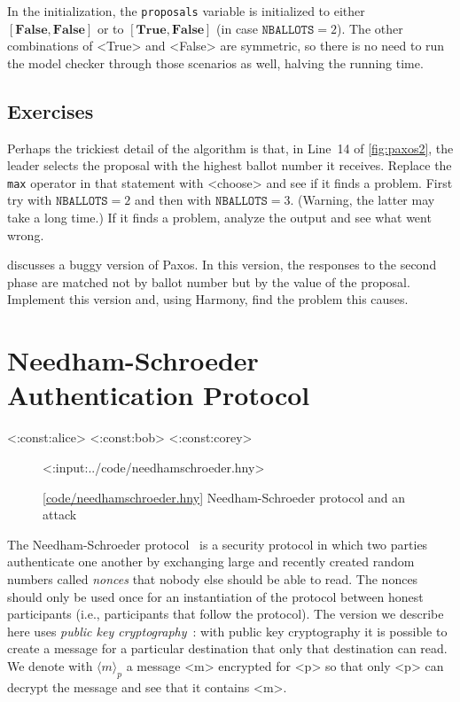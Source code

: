 \documentclass{report}
\newcommand{\harmonylink}[1]{%
[\href{https://harmony.cs.cornell.edu/#1}{\underline{#1}}]%
}
\newenvironment{code}{
\tcolorbox
}{
\endtcolorbox
}
\begin{document}
In the initialization, the \texttt{proposals} variable is initialized
to either $[\mathbf{False}, \mathbf{False}]$ or
to $[\mathbf{True}, \mathbf{False}]$ (in case $\texttt{NBALLOTS} = 2$).
The other combinations of <{True}> and <{False}> are symmetric,
so there is no need to run the model checker through those scenarios as
well, halving the running time.

\section*{Exercises}
\begin{problems}
\item Perhaps the trickiest detail of the algorithm is that, in Line~14
of \autoref{fig:paxos2}, the leader selects the proposal with the highest
ballot number it receives.  Replace the \texttt{max} operator in that statement
with <{choose}> and see if it finds a problem.  First try with
$\texttt{NBALLOTS} = 2$ and then with $\texttt{NBALLOTS} = 3$.
(Warning, the latter may take a long time.)  If it finds a problem,
analyze the output and see what went wrong.
\item \cite{MWA19} discusses a buggy version of Paxos.  In this version,
the responses to the second phase are matched not by ballot number but
by the value of the proposal.  Implement this version and, using Harmony,
find the problem this causes.
\end{problems}

\chapter{Needham-Schroeder Authentication Protocol}
\label{ch:ns}

<{:const:alice}>
<{:const:bob}>
<{:const:corey}>

\begin{figure}
\begin{code}
<{:input:../code/needhamschroeder.hny}>
\end{code}
\caption{\harmonylink{code/needhamschroeder.hny} Needham-Schroeder protocol and an attack}
\label{fig:ns}
\end{figure}

The Needham-Schroeder protocol~\cite{NS78} is a security protocol in which two parties
authenticate one another by exchanging large and recently created random numbers
called \emph{nonces} that nobody else should be able to read.
The nonces should only be used once for an instantiation of the protocol between
honest participants (i.e., participants that follow the protocol).
The version we describe here uses \emph{public key cryptography}~\cite{DH76}: with public key
cryptography it is possible to create a message for a particular destination that
only that destination can read.  We denote with $\langle m \rangle_p$ a message
<{m}> encrypted for <{p}> so that only <{p}> can decrypt the message and see that it contains <{m}>.
\end{document}
